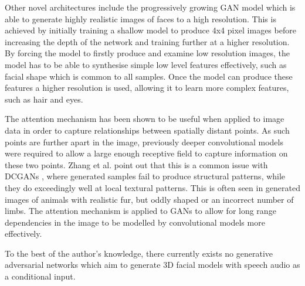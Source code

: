 Other novel architectures include the progressively growing GAN model \cite{Karras2017b} which is able to generate highly realistic images of faces to a high resolution.
This is achieved by initially training a shallow model to produce 4x4 pixel images before increasing the depth of the network and training further at a higher resolution.
By forcing the model to firstly produce and examine low resolution images, the model has to be able to synthesise simple low level features effectively, such as facial shape which is common to all samples.
Once the model can produce these features a higher resolution is used, allowing it to learn more complex features, such as hair and eyes.

The attention mechanism \cite{Vaswani2017} has been shown to be useful when applied to image data \cite{Xu2015} in order to capture relationships between spatially distant points.
As such points are further apart in the image, previously deeper convolutional models were required to allow a large enough receptive field to capture information on these two points.
Zhang et al. point out that this is a common issue with DCGANs \cite{Radford2016}, where generated samples fail to produce structural patterns, while they do exceedingly well at local textural patterns.
This is often seen in generated images of animals with realistic fur, but oddly shaped or an incorrect number of limbs.
The attention mechanism is applied to GANs \cite{Zhang2018} to allow for long range dependencies in the image to be modelled by convolutional models more effectively.

To the best of the author's knowledge, there currently exists no generative adversarial networks which aim to generate 3D facial models with speech audio as a conditional input.

%
%
%